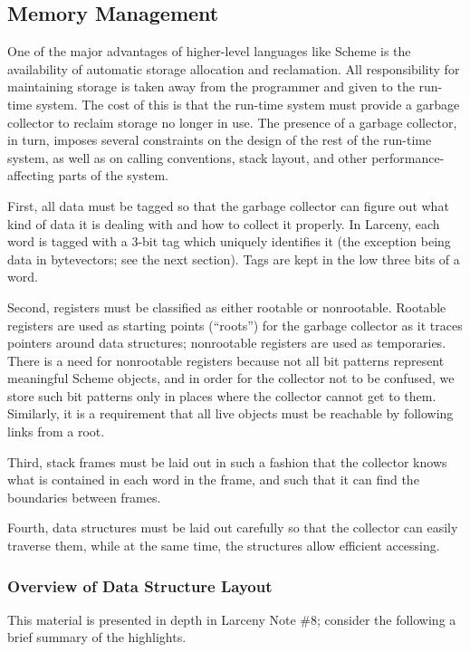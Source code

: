 \subsection{Memory Management}

One of the major advantages of higher-level languages like Scheme is
the availability of automatic storage allocation and reclamation. All
responsibility for maintaining storage is taken away from the programmer
and given to the run-time system. The cost of this is that the run-time
system must provide a garbage collector to reclaim storage no longer in
use. The presence of a garbage collector, in turn, imposes several
constraints on the design of the rest of the run-time system, as well as
on calling conventions, stack layout, and other performance-affecting
parts of the system.

First, all data must be tagged so that the garbage collector can
figure out what kind of data it is dealing with and how to collect it
properly. In Larceny, each word is tagged with a 3-bit tag which
uniquely identifies it (the exception being data in bytevectors; see
the next section).  Tags are kept in the low three bits of a word.

Second, registers must be classified as either rootable or
nonrootable.  Rootable registers are used as starting points
(``roots'') for the garbage collector as it traces pointers around
data structures; nonrootable registers are used as temporaries. There
is a need for nonrootable registers because not all bit patterns
represent meaningful Scheme objects, and in order for the collector
not to be confused, we store such bit patterns only in places where
the collector cannot get to them. Similarly, it is a requirement that
all live objects must be reachable by following links from a root.

Third, stack frames must be laid out in such a fashion that the
collector knows what is contained in each word in the frame, and such
that it can find the boundaries between frames.

Fourth, data structures must be laid out carefully so that the collector
can easily traverse them, while at the same time, the structures allow
efficient accessing.

\subsubsection{Overview of Data Structure Layout}

This material is presented in depth in Larceny Note \#8; consider the
following a brief summary of the highlights.


